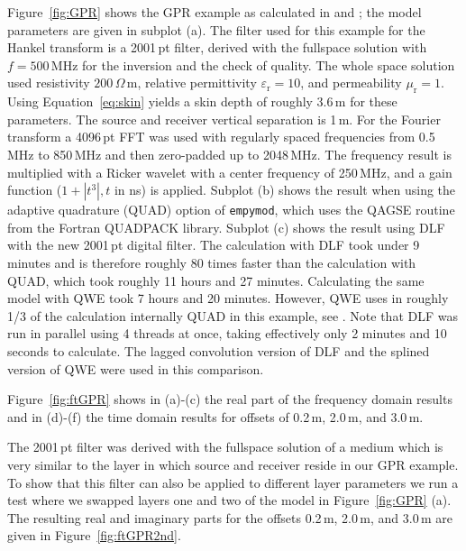\documentclass[paper,twocolumn,twoside]{geophysics}
\newcommand{\mr}[1]{\mathrm{#1}}
\begin{document}
Figure~\ref{fig:GPR} shows the GPR example as calculated in
\cite{GEO.15.Hunziker} and \cite{GEO.17.Werthmuller}; the model parameters are
given in subplot (a). The filter used for this example for the Hankel transform
is a 2001\,pt filter, derived with the fullspace solution with $f=500\,$MHz for
the inversion and the check of quality. The whole space solution used
resistivity $200\,\Omega\,$m, relative permittivity $\varepsilon_\mr{r}=10$,
and permeability $\mu_\mr{r}=1$. Using Equation~\ref{eq:skin} yields a skin
depth of roughly 3.6\,m for these parameters. The source and receiver vertical
separation is 1\,m. For the Fourier transform a 4096\,pt FFT was used with
regularly spaced frequencies from 0.5\,MHz to 850\,MHz and then zero-padded up
to 2048\,MHz. The frequency result is multiplied with a Ricker wavelet with a
center frequency of 250\,MHz, and a gain function ($1 + |t^3|, t$ in ns) is
applied. Subplot (b) shows the result when using the adaptive quadrature (QUAD)
option of \texttt{empymod}, which uses the QAGSE routine from the Fortran
QUADPACK library. Subplot (c) shows the result using DLF with the new 2001\,pt
digital filter. The calculation with DLF took under 9 minutes and is therefore
roughly 80 times faster than the calculation with QUAD, which took roughly 11
hours and 27 minutes. Calculating the same model with QWE took 7 hours and 20
minutes. However, QWE uses in roughly 1/3 of the calculation internally QUAD in
this example, see \cite{GEO.17.Werthmuller}. Note that DLF was run in parallel
using 4 threads at once, taking effectively only 2 minutes and 10 seconds to
calculate.
The lagged convolution version of DLF and the splined version of QWE were used
in this comparison.
%
%

Figure~\ref{fig:ftGPR} shows in (a)-(c) the real part of the frequency domain
results and in (d)-(f) the time domain results for offsets of 0.2\,m, 2.0\,m,
and 3.0\,m.
%
%

The 2001\,pt filter was derived with the fullspace solution of a medium which
is very similar to the layer in which source and receiver reside in our GPR
example. To show that this filter can also be applied to different layer
parameters we run a test where we swapped layers one and two of the model in
Figure~\ref{fig:GPR} (a). The resulting real and imaginary parts for the
offsets 0.2\,m, 2.0\,m, and 3.0\,m are given in Figure~\ref{fig:ftGPR2nd}.
%
%
\end{document}
